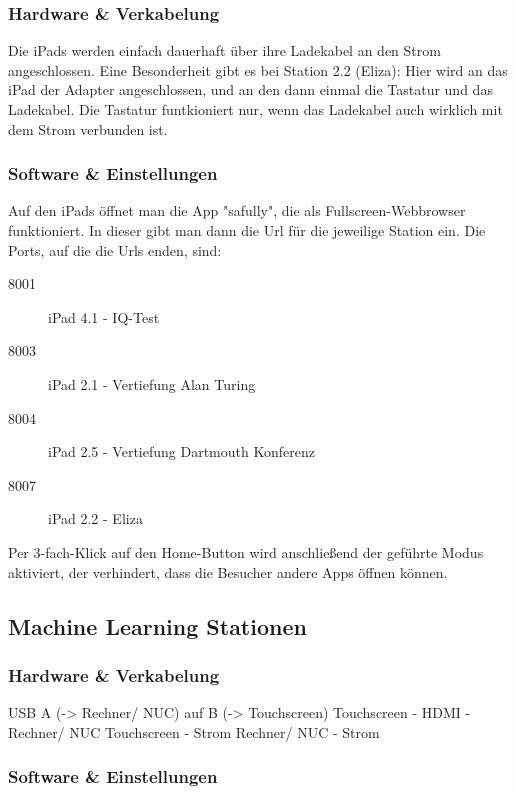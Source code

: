 \documentclass [titlepage,a4paper]{article}
\begin{document}
\subsubsection{Hardware \& Verkabelung}

Die iPads werden einfach dauerhaft über ihre Ladekabel an den Strom angeschlossen. Eine Besonderheit gibt es bei Station 2.2 (Eliza): Hier wird an das iPad der Adapter angeschlossen, und an den dann einmal die Tastatur und das Ladekabel. Die Tastatur funtkioniert nur, wenn das Ladekabel auch wirklich mit dem Strom verbunden ist.

\subsubsection{Software \& Einstellungen}

Auf den iPads öffnet man die App "safully", die als Fullscreen-Webbrowser funktioniert. In dieser gibt man dann die Url für die jeweilige Station ein. Die Ports, auf die die Urls enden, sind: \begin{description}
    \item[8001] iPad 4.1 - IQ-Test 
    \item[8003] iPad 2.1 - Vertiefung Alan Turing
    \item[8004] iPad 2.5 - Vertiefung Dartmouth Konferenz
    \item[8007] iPad 2.2 - Eliza 
\end{description}

Per 3-fach-Klick auf den Home-Button wird anschließend der geführte Modus aktiviert, der verhindert, dass die Besucher andere Apps öffnen können. 

\subsection{Machine Learning Stationen}

\subsubsection{Hardware \& Verkabelung}

USB A (-> Rechner/ NUC) auf B (-> Touchscreen)
Touchscreen - HDMI - Rechner/ NUC
Touchscreen - Strom
Rechner/ NUC - Strom

\subsubsection{Software \& Einstellungen}
\end{document}
